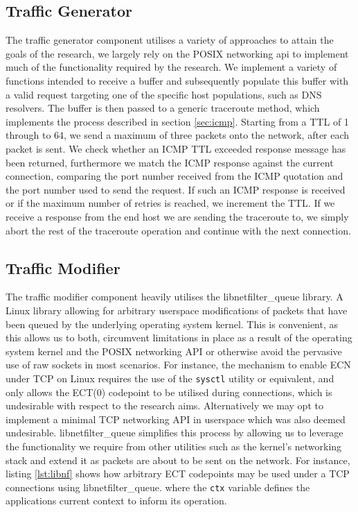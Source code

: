 \documentclass{l4proj}
\begin{document}
\subsection{Traffic Generator}
\label{sec:impltg}

The traffic generator component utilises a variety of approaches to attain the goals of the research, we largely rely on the POSIX networking api to implement much of the functionality required by the research. We implement a variety of functions intended to receive a buffer and subsequently populate this buffer with a valid request targeting one of the specific host populations, such as DNS resolvers. The buffer is then passed to a generic traceroute method, which implements the process described in section \ref{sec:icmp}. Starting from a TTL of 1 through to 64, we send a maximum of three packets onto the network, after each packet is sent. We check whether an ICMP TTL exceeded response message has been returned, furthermore we match the ICMP response against the current connection, comparing the port number received from the ICMP quotation and the port number used to send the request. If such an ICMP response is received or if the maximum number of retries is reached, we increment the TTL. If we receive a response from the end host we are sending the traceroute to, we simply abort the rest of the traceroute operation and continue with the next connection.

\subsection{Traffic Modifier}

The traffic modifier component heavily utilises the libnetfilter\_queue library. A Linux library allowing for arbitrary userspace modifications of packets that have been queued by the underlying operating system kernel. This is convenient, as this allows us to both, circumvent limitations in place as a result of the operating system kernel and the POSIX networking API or otherwise avoid the pervasive use of raw sockets in most scenarios. For instance, the mechanism to enable ECN under TCP on Linux requires the use of the \lstinline{sysctl} utility or equivalent, and only allows the ECT(0) codepoint to be utilised during connections, which is undesirable with respect to the research aims. Alternatively we may opt to implement a minimal TCP networking API in userspace which was also deemed undesirable. libnetfilter\_queue simplifies this process by allowing us to leverage the functionality we require from other utilities such as the kernel's networking stack and extend it as packets are about to be sent on the network. For instance, listing \ref{lst:libnf} shows how arbitrary ECT codepoints may be used under a TCP connections using libnetfilter\_queue. where the \lstinline{ctx} variable defines the applications current context to inform its operation.
\end{document}
